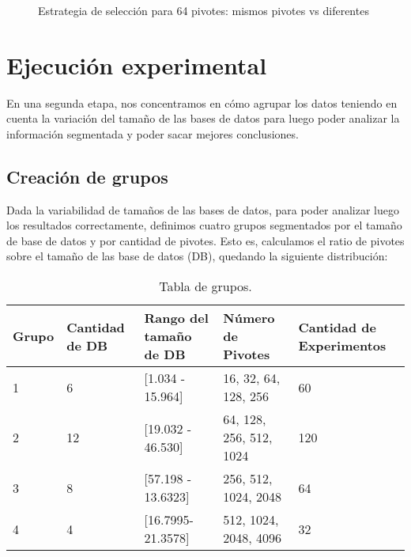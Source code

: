 \begin{figure}[tb]
\centering
{}
		\caption{\small Estrategia de selecci\'on para 64 pivotes: mismos pivotes vs diferentes}
		\label{fig:same-vs-diff-64Pivotes}
\end{figure}

\section{Ejecuci\'on experimental}

En una segunda etapa,  nos concentramos en c\'omo agrupar los datos teniendo en cuenta la variaci\'on del tama\~no de las bases de datos para luego poder analizar la informaci\'on segmentada y poder sacar mejores conclusiones.\\

\subsection{Creaci\'on de grupos}

Dada la variabilidad de tamaños de las bases de datos, para poder analizar luego los resultados correctamente, definimos cuatro grupos segmentados por el tamaño de base de datos y por cantidad de pivotes. Esto es, calculamos el ratio de pivotes sobre el tamaño de las base de datos (DB), quedando la siguiente distribuci\'on:\\

\begin{table}[htbp]
\begin{center}
\begin{tabular}{|p{1.1cm}|p{1.8cm}|p{3.2cm}|p{2.2cm}|p{2.5cm}|}
\hline
Grupo & 
Cantidad de DB & 
Rango del tama\~no de DB & 
N\'umero de Pivotes &  
Cantidad de Experimentos\\
\hline \hline
1 & 
6 & 
[1.034 - 15.964] & 
16, 32, 64, 128, 256 & 
60  \\ \hline
2 &
12 &
[19.032 - 46.530] &
64, 128, 256, 512, 1024 &
120  \\ \hline
3 &
8 &
[57.198 - 13.6323] &
256, 512, 1024, 2048 &
64  \\ \hline
4 &
4 &
[16.7995- 21.3578] &
512, 1024, 2048, 4096 &
32  \\ \hline
\end{tabular}
\caption{Tabla de grupos.}
\label{tabla:grupos}
\end{center}
\end{table}

